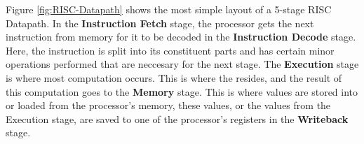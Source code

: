     Figure \ref{fig:RISC-Datapath} shows the most simple layout of a 5-stage RISC Datapath. In the \textbf{Instruction Fetch} stage, the processor gets the next instruction from memory for it to be decoded in the \textbf{Instruction Decode} stage. Here, the instruction is split into its constituent parts and has certain minor operations performed that are neccesary for the next stage. The \textbf{Execution} stage is where most computation occurs. This is where the  resides, and the result of this computation goes to the \textbf{Memory} stage. This is where values are stored into or loaded from the processor's memory, these values, or the values from the Execution stage, are saved to one of the processor's registers in the \textbf{Writeback} stage. 
    
